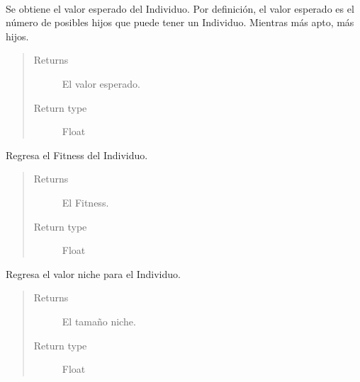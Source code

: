 \documentclass[class=report, crop=false]{standalone}
\begin{document}
\begin{fulllineitems}
\begin{fulllineitems}

~
\vspace{-0.2cm}

Se obtiene el valor esperado del Individuo.\break
Por definición, el valor esperado es el número de posibles
hijos que puede tener un Individuo. Mientras más apto, más 
hijos.

\begin{quote}\begin{description}
\item[{Returns}] \leavevmode
El valor esperado.
\item[{Return type}] \leavevmode
Float
\end{description}\end{quote}

\end{fulllineitems}

\begin{fulllineitems}

Regresa el Fitness del Individuo.
\begin{quote}\begin{description}
\item[{Returns}] \leavevmode
El Fitness.
\item[{Return type}] \leavevmode
Float
\end{description}\end{quote}

\end{fulllineitems}

\begin{fulllineitems}

Regresa el valor niche para el Individuo.

\begin{quote}\begin{description}
\item[{Returns}] \leavevmode
El tamaño niche.
\item[{Return type}] \leavevmode
Float
\end{description}\end{quote}

\end{fulllineitems}


\end{fulllineitems}
\end{document}
